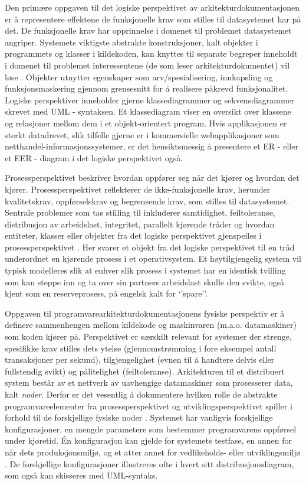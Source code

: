 Den primære oppgaven til det logiske perspektivet av arkitekturdokumentasjonen er å representere effektene de funksjonelle krav som stilles til datasystemet har på det. De funksjonelle krav har opprinnelse i domenet til problemet datasystemet angriper. Systemets viktigste abstrakte konstruksjoner, kalt objekter i programmets og klasser i kildekoden, kan knyttes til separate begreper inneholdt i domenet til problemet interessentene (de som leser arkitekturdokumentet) vil løse \citep{kruchten1995}. Objekter utnytter egenskaper som arv/spesialisering, innkapsling og funksjonsmaskering gjennom grensesnitt for å realisere påkrevd funksjonalitet. Logiske perspektiver inneholder gjerne klassediagrammer og sekvensdiagrammer skrevet med UML - syntaksen. Et klassediagram viser en oversikt over klassene og relasjoner mellom dem i et objekt-orientert program. Hvis applikasjonen er sterkt datadrevet, slik tilfelle gjerne er i kommersielle webapplikasjoner som netthandel-informasjonssystemer, er det hensiktsmessig å presentere et ER -  eller et EER - diagram i det logiske perspektivet også.

Prosessperspektivet beskriver hvordan oppfører seg når det kjører og hvordan det kjører. Prosessperspektivet reflekterer de ikke-funksjonelle krav, herunder kvalitetskrav, oppførselskrav og begrensende krav, som stilles til datasystemet. Sentrale problemer som tas stilling til inkluderer samtidighet, feiltoleranse, distribusjon av arbeidslast, integritet, parallelt kjørende tråder og hvordan entiteter, klasser eller objekter fra det logiske perspektivet gjenspeiles i prosessperspektivet \citep{kruchten1995}. Her svarer et objekt fra det logiske perspektivet til en tråd underordnet en kjørende prosess i et operativsystem. Et høytilgjengelig system vil typisk modelleres slik at enhver slik prosess i systemet har en identisk tvilling som kan steppe inn og ta over sin partners arbeidslast skulle den svikte, også kjent som en reserveprosess, på engelsk kalt for ‘’spare’’.

Oppgaven til programvarearkitekturdokumentasjonens fysiske perspektiv er å definere sammenhengen mellom kildekode og maskinvaren (m.a.o. datamaskiner) som koden kjører på. Perspektivet er særskilt relevant for systemer der strenge, spesifikke krav stilles dets ytelse (gjennomstrømming i fore eksempel antall transaksjoner per sekund), tilgjengelighet (evnen til å handtere delvis eller fullstendig svikt) og pålitelighet (feiltoleranse). Arkitekturen til et distribuert system består av et nettverk av uavhengige datamaskiner som prosesserer data, kalt \emph{noder}. Derfor er det vesentlig å dokumentere hvilken rolle de abstrakte programvareelementer fra prosessperspektivet og utviklingsperspektivet spiller i forhold til de forskjellige fysiske noder \citep{kruchten1995}. Systemet har vanligvis forskjellige konfigurasjoner, en mengde parametere som bestemmer programvarens oppførsel under kjøretid. Én konfigurasjon kan gjelde for systemets testfase, en annen for når dets produksjonsmiljø, og et atter annet for vedlikeholds- eller utviklingsmiljø \citep{kruchten1995}. De forskjellige konfigurasjoner illustreres ofte i hvert sitt distribusjonsdiagram, som også kan skisseres med UML-syntaks.

